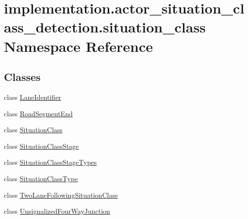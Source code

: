 \hypertarget{namespaceimplementation_1_1actor__situation__class__detection_1_1situation__class}{}\section{implementation.\+actor\+\_\+situation\+\_\+class\+\_\+detection.\+situation\+\_\+class Namespace Reference}
\label{namespaceimplementation_1_1actor__situation__class__detection_1_1situation__class}
\subsection*{Classes}
\begin{DoxyCompactItemize}
\item 
class \hyperlink{classimplementation_1_1actor__situation__class__detection_1_1situation__class_1_1_lane_identifier}{Lane\+Identifier}
\item 
class \hyperlink{classimplementation_1_1actor__situation__class__detection_1_1situation__class_1_1_road_segment_end}{Road\+Segment\+End}
\item 
class \hyperlink{classimplementation_1_1actor__situation__class__detection_1_1situation__class_1_1_situation_class}{Situation\+Class}
\item 
class \hyperlink{classimplementation_1_1actor__situation__class__detection_1_1situation__class_1_1_situation_class_stage}{Situation\+Class\+Stage}
\item 
class \hyperlink{classimplementation_1_1actor__situation__class__detection_1_1situation__class_1_1_situation_class_stage_types}{Situation\+Class\+Stage\+Types}
\item 
class \hyperlink{classimplementation_1_1actor__situation__class__detection_1_1situation__class_1_1_situation_class_type}{Situation\+Class\+Type}
\item 
class \hyperlink{classimplementation_1_1actor__situation__class__detection_1_1situation__class_1_1_two_lane_following_situation_class}{Two\+Lane\+Following\+Situation\+Class}
\item 
class \hyperlink{classimplementation_1_1actor__situation__class__detection_1_1situation__class_1_1_unsignalized_four_way_junction}{Unsignalized\+Four\+Way\+Junction}
\end{DoxyCompactItemize}
